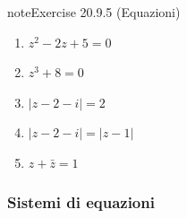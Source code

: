 \documentclass[letterpaper,10pt,italian]{jupyterBook}
\begin{document}
\begin{sphinxadmonition}{note}{Exercise 20.9.5 (Equazioni)}
\begin{enumerate}
\item {} 
\sphinxAtStartPar
\(z^2 - 2z + 5 = 0\)

\item {} 
\sphinxAtStartPar
\(z^3 + 8 = 0\)

\item {} 
\sphinxAtStartPar
\(|z-2-i| = 2\)

\item {} 
\sphinxAtStartPar
\(|z-2-i| = |z-1|\)

\item {} 
\sphinxAtStartPar
\(z + \bar{z} = 1\)

\end{enumerate}


\end{sphinxadmonition}


\subsubsection{Sistemi di equazioni}
\label{\detokenize{ch/algebra/complex-algebra-problems:sistemi-di-equazioni}}\label{\detokenize{ch/algebra/complex-algebra-problems:math-hs-algebra-complex-problems-equations-sys}} \label{exercise:ch/algebra/complex-algebra-problems-exercise-5}
\end{document}
